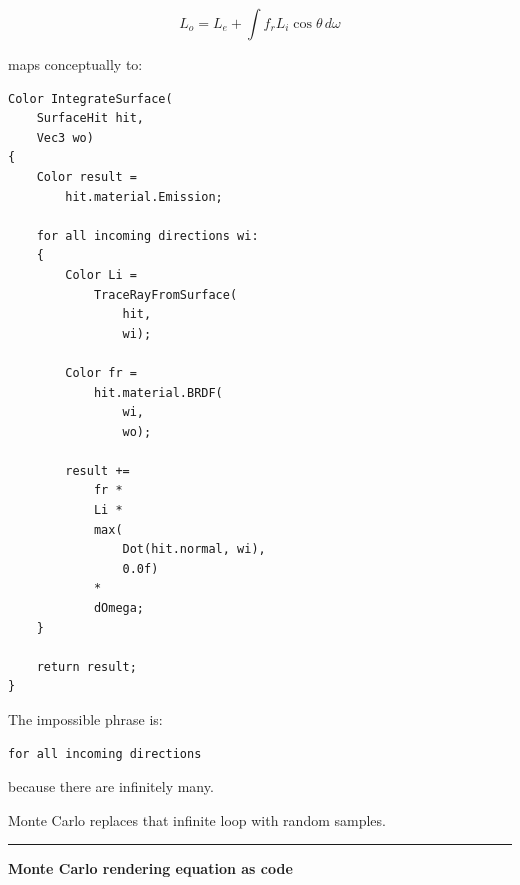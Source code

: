 \[
L_o
=
L_e+
\int
f_rL_i\cos\theta\,d\omega
\]

maps conceptually to:

\begin{verbatim}
Color IntegrateSurface(
    SurfaceHit hit,
    Vec3 wo)
{
    Color result =
        hit.material.Emission;

    for all incoming directions wi:
    {
        Color Li =
            TraceRayFromSurface(
                hit,
                wi);

        Color fr =
            hit.material.BRDF(
                wi,
                wo);

        result +=
            fr *
            Li *
            max(
                Dot(hit.normal, wi),
                0.0f)
            *
            dOmega;
    }

    return result;
}
\end{verbatim}

The impossible phrase is:

\begin{verbatim}
for all incoming directions
\end{verbatim}

because there are infinitely many.

Monte Carlo replaces that infinite loop with random samples.

\begin{center}\rule{0.5\linewidth}{0.5pt}\end{center}

\textbf{Monte Carlo rendering equation as code}

